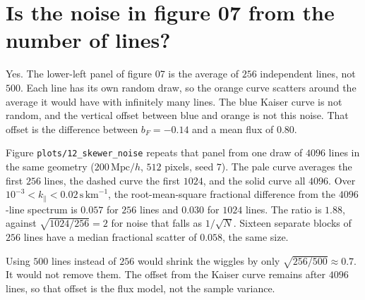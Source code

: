 \documentclass[11pt]{article}
\begin{document}
\section{Is the noise in figure 07 from the number of lines?}

Yes. The lower-left panel of figure 07 is the average of $256$ independent lines, not $500$. Each line has its own random draw, so the orange curve scatters around the average it would have with infinitely many lines. The blue Kaiser curve is not random, and the vertical offset between blue and orange is not this noise. That offset is the difference between $b_F=-0.14$ and a mean flux of $0.80$.

Figure \texttt{plots/12\_skewer\_noise} repeats that panel from one draw of $4096$ lines in the same geometry ($200\,\mathrm{Mpc}/h$, $512$ pixels, seed $7$). The pale curve averages the first $256$ lines, the dashed curve the first $1024$, and the solid curve all $4096$. Over $10^{-3}<k_\parallel<0.02\,\mathrm{s\,km}^{-1}$, the root-mean-square fractional difference from the $4096$-line spectrum is $0.057$ for $256$ lines and $0.030$ for $1024$ lines. The ratio is $1.88$, against $\sqrt{1024/256}=2$ for noise that falls as $1/\sqrt{N}$. Sixteen separate blocks of $256$ lines have a median fractional scatter of $0.058$, the same size.

Using $500$ lines instead of $256$ would shrink the wiggles by only $\sqrt{256/500}\approx 0.7$. It would not remove them. The offset from the Kaiser curve remains after $4096$ lines, so that offset is the flux model, not the sample variance.



\end{document}

